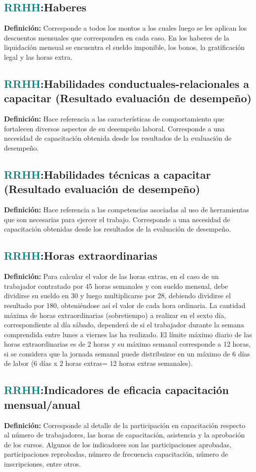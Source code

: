 \documentclass[12pt]{article}
\begin{document}
\subsection{\textcolor{teal}{RRHH}:{Haberes}}
\textbf{Definición:} Corresponde a todos los montos a los cuales luego se les aplican los descuentos mensuales que corresponden en cada caso. En los haberes de la liquidación mensual se encuentra el sueldo imponible, los bonos, la gratificación legal y las horas extra.
\subsection{\textcolor{teal}{RRHH}:{Habilidades conductuales-relacionales a capacitar (Resultado evaluación de desempeño)}}
\textbf{Definición:} Hace referencia a las características de comportamiento que fortalecen diversos aspectos de su desempeño laboral. Corresponde a una necesidad de capacitación obtenida desde los resultados de la evaluación de desempeño.
\subsection{\textcolor{teal}{RRHH}:{Habilidades técnicas a capacitar (Resultado evaluación de desempeño)}}
\textbf{Definición:} Hace referencia a las competencias asociadas al uso de herramientas que son necesarias para ejercer el trabajo. Corresponde a una necesidad de capacitación obtenidas desde los resultados de la evaluación de desempeño.
\subsection{\textcolor{teal}{RRHH}:{Horas extraordinarias}}
\textbf{Definición:} Para calcular el valor de las horas extras, en el caso de un trabajador contratado por 45 horas semanales y con sueldo mensual, debe dividirse su sueldo en 30 y luego multiplicarse por 28, debiendo dividirse el resultado por 180, obteniéndose así el valor de cada hora ordinaria.
La cantidad máxima de horas extraordinarias (sobretiempo) a realizar en el sexto día, correspondiente al día sábado, dependerá de si el trabajador durante la semana comprendida entre lunes a viernes las ha realizado. El límite máximo diario de las horas extraordinarias es de 2 horas y su máximo semanal corresponde a 12 horas, si se considera que la jornada semanal puede distribuirse en un máximo de 6 días de labor (6 días x 2 horas extras= 12 horas extras semanales). 
\subsection{\textcolor{teal}{RRHH}:{Indicadores de eficacia capacitación mensual/anual}}
\textbf{Definición:} Corresponde al detalle de la participación en capacitación respecto al número de trabajadores, las horas de capacitación, asistencia y la aprobación de los cursos. Algunos de los indicadores son las participaciones aprobadas, participaciones reprobadas, número de frecuencia capacitación, número de inscripciones, entre otros.
\end{document}
